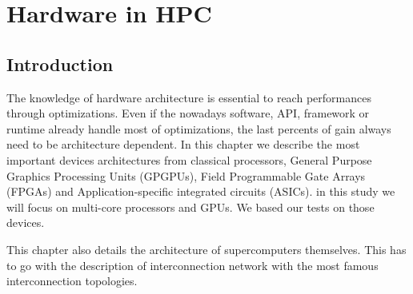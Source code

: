 
\chapter{Hardware in HPC}

\section{Introduction}

The knowledge of hardware architecture is essential to reach performances through optimizations.
Even if the nowadays software, API, framework or runtime already handle most of optimizations, the last percents of gain always need to be architecture dependent. 
In this chapter we describe the most important devices architectures from classical processors, General Purpose Graphics Processing Units (GPGPUs), Field Programmable Gate Arrays (FPGAs) and Application-specific integrated circuits (ASICs).
in this study we will focus on multi-core processors and GPUs. 
We based our tests on those devices. 

This chapter also details the architecture of supercomputers themselves. 
This has to go with the description of interconnection network with the most famous interconnection topologies. 


